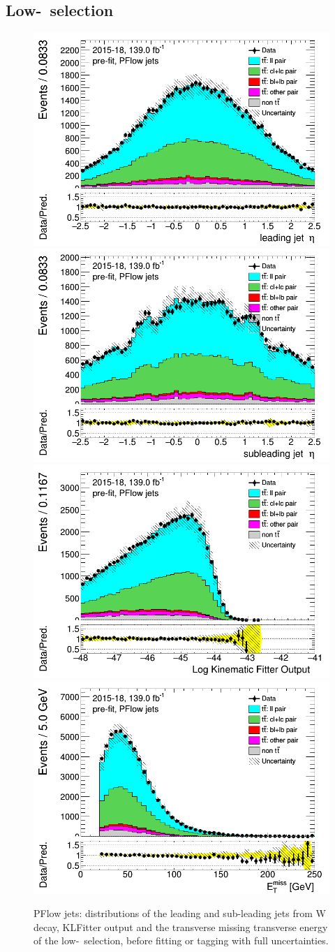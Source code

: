 \subsection{Low-\pt\ selection}
\label{sec:appendix_lowpT_selection}
\newpage	
\begin{figure}[H]
\includegraphics[width=.45\textwidth]{FTAG_plots/pretagNoRwLowpTPFlowall/DataMC_h_J0_eta.png}
\includegraphics[width=.45\textwidth]{FTAG_plots/pretagNoRwLowpTPFlowall/DataMC_h_J1_eta.png}\\
\includegraphics[width=.45\textwidth]{FTAG_plots/pretagNoRwLowpTPFlowall/DataMC_h_LLR.png}
\includegraphics[width=.45\textwidth]{FTAG_plots/pretagNoRwLowpTPFlowall/DataMC_h_MET.png}\\

\caption{PFlow jets: distributions of the leading and sub-leading jets 
from W decay, KLFitter output and the transverse missing transverse 
energy of the low-\pt\ selection, before fitting or tagging with 
full uncertainties.} \label{fig:lowpT_jets_VRJets}
\end{figure}

